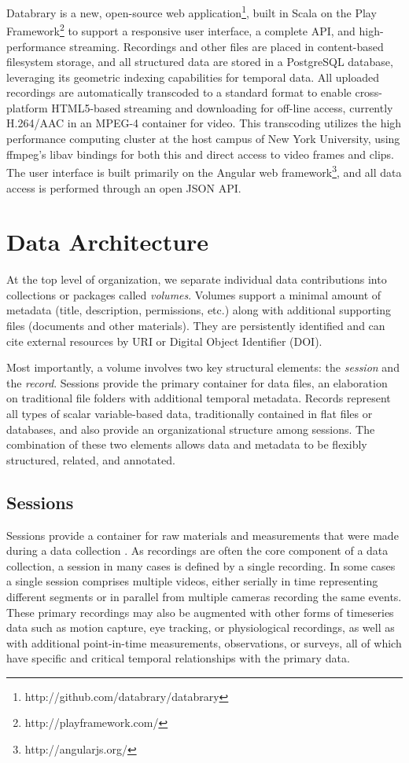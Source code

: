 \documentclass{sig-alternate}
\begin{document}
Databrary is a new, open-source web application\footnote{http://github.com/databrary/databrary}, built in Scala on the Play Framework\footnote{http://playframework.com/} to support a responsive user interface, a complete API, and high-performance streaming.
Recordings and other files are placed in content-based filesystem storage, and all structured data are stored in a PostgreSQL database, leveraging its geometric indexing capabilities for temporal data.
All uploaded recordings are automatically transcoded to a standard format to enable cross-platform HTML5-based streaming and downloading for off-line access, currently H.264/AAC in an MPEG-4 container for video.
This transcoding utilizes the high performance computing cluster at the host campus of New York University, using ffmpeg's libav bindings for both this and direct access to video frames and clips.
The user interface is built primarily on the Angular web framework\footnote{http://angularjs.org/}, and all data access is performed through an open JSON API.

\section{Data Architecture}

At the top level of organization, we separate individual data contributions into collections or packages called \emph{volumes}.
Volumes support a minimal amount of metadata (title, description, permissions, etc.) along with additional supporting files (documents and other materials).
They are persistently identified and can cite external resources by URI or Digital Object Identifier (DOI).

Most importantly, a volume involves two key structural elements: the \emph{session} and the \emph{record}.
Sessions provide the primary container for data files, an elaboration on traditional file folders with additional temporal metadata.
Records represent all types of scalar variable-based data, traditionally contained in flat files or databases, and also provide an organizational structure among sessions.
The combination of these two elements allows data and metadata to be flexibly structured, related, and annotated.

\subsection{Sessions}

Sessions provide a container for raw materials and measurements that were made during a data collection \cite{Bakeman_2012}.
As recordings are often the core component of a data collection, a session in many cases is defined by a single recording.
In some cases a single session comprises multiple videos, either serially in time representing different segments or in parallel from multiple cameras recording the same events.
These primary recordings may also be augmented with other forms of timeseries data such as motion capture, eye tracking, or physiological recordings, as well as with additional point-in-time measurements, observations, or surveys, all of which have specific and critical temporal relationships with the primary data.
\end{document}
